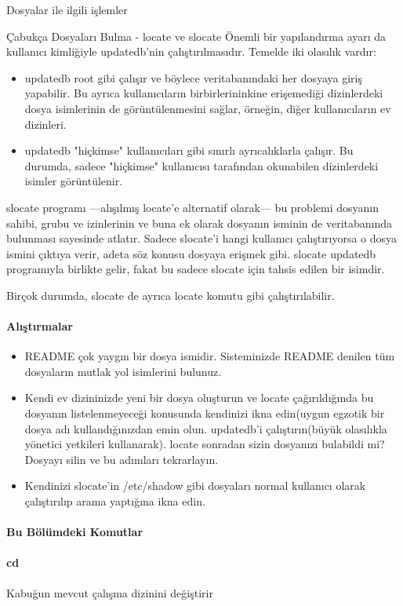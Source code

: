 \documentclass[10pt,a5paper]{book}
\begin{document}
\begin{section}{Dosyalar ile ilgili işlemler}
\begin{subsection}{Çabukça Dosyaları Bulma - locate ve slocate}
	Önemli bir yapılandırma ayarı da kullanıcı kimliğiyle updatedb'nin çalıştırılmasıdır. Temelde iki olasılık vardır:
	\begin{itemize}
	\item updatedb root gibi çalışır ve böylece veritabanındaki her dosyaya giriş yapabilir. Bu ayrıca kullanıcıların birbirlerininkine erişemediği dizinlerdeki dosya isimlerinin de görüntülenmesini sağlar, örneğin, diğer kullanıcıların ev dizinleri.
	\item updatedb "hiçkimse" kullanıcıları gibi sınırlı ayrıcalıklarla çalışır. Bu durumda, sadece "hiçkimse" kullanıcısı tarafından okunabilen dizinlerdeki isimler görüntülenir. 
	\end{itemize}
	
slocate programı —alışılmış locate'e alternatif olarak— bu problemi dosyanın sahibi, grubu ve  izinlerinin ve buna ek olarak dosyanın isminin de veritabanında bulunması sayesinde atlatır. Sadece slocate'i hangi kullanıcı çalıştırıyorsa o dosya ismini çıktıya verir, adeta söz konusu dosyaya erişmek gibi. slocate updatedb programıyla birlikte gelir, fakat bu sadece slocate için tahsis edilen bir isimdir.

Birçok durumda, slocate de ayrıca locate komutu gibi çalıştırılabilir.

\paragraph{Alıştırmalar}{
\begin{itemize}
 \item README çok yaygın bir dosya ismidir. Sisteminizde README denilen tüm dosyaların mutlak yol isimlerini bulunuz.
 \item Kendi ev dizininizde yeni bir dosya oluşturun ve locate çağırıldığında bu dosyanın listelenmeyeceği konusunda kendinizi ikna edin(uygun egzotik bir dosya adı kullandığınızdan emin olun. updatedb'i çalıştırın(büyük olasılıkla yönetici yetkileri kullanarak). locate sonradan sizin dosyanızı bulabildi mi? Dosyayı silin ve bu adımları tekrarlayın.
 \item Kendinizi slocate'in /etc/shadow gibi dosyaları normal kullanıcı olarak çalıştırılıp arama yaptığına ikna edin.
\end{itemize}}

\paragraph{Bu Bölümdeki Komutlar}{}
\paragraph{cd}{Kabuğun mevcut çalışma dizinini değiştirir}

\end{subsection}
\end{section}
\end{document}
